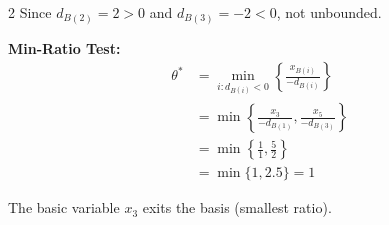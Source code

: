 \documentclass[10pt,a4paper]{article}
\newcommand{\mysubsection}[1]{\vspace{2pt}\textbf{#1:}\vspace{1pt}}
\begin{document}
\begin{multicols}{2}
Since $d_{B(2)} = 2 > 0$ and $d_{B(3)} = -2 < 0$, not unbounded.

\mysubsection{Min-Ratio Test}
\begin{align*}
\theta^* &= \min_{i : d_{B(i)} < 0}\left\{\frac{x_{B(i)}}{-d_{B(i)}}\right\} \\
&= \min\left\{\frac{x_3}{-d_{B(1)}}, \frac{x_5}{-d_{B(3)}}\right\} \\
&= \min\left\{\frac{1}{1}, \frac{5}{2}\right\} \\
&= \min\{1, 2.5\} = 1
\end{align*}

The basic variable $x_3$ exits the basis (smallest ratio).

\end{multicols}
\end{document}
